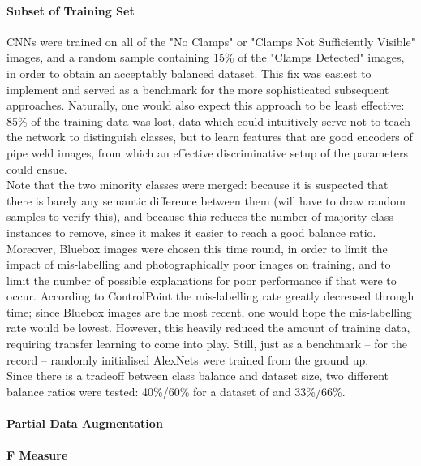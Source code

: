 \documentclass[a4paper,11pt]{article}
\begin{document}
\paragraph{Subset of Training Set}

CNNs were trained on all of the "No Clamps" or "Clamps Not Sufficiently Visible" images, and a random sample containing 15\% of the "Clamps Detected" images, in order to obtain an acceptably balanced dataset. This fix was easiest to implement and served as a benchmark for the more sophisticated subsequent approaches. Naturally, one would also expect this approach to be least effective: 85\% of the training data was lost, data which could intuitively serve not to teach the network to distinguish classes, but to learn features that are good encoders of pipe weld images, from which an effective discriminative setup of the parameters could ensue. \\

Note that the two minority classes were merged: because it is suspected that there is barely any semantic difference between them (will have to draw random samples to verify this), and because this reduces the number of majority class instances to remove, since it makes it easier to reach a good balance ratio. \\

Moreover, Bluebox images were chosen this time round, in order to limit the impact of mis-labelling and photographically poor images on training, and to limit the number of possible explanations for poor performance if that were to occur. According to ControlPoint the mis-labelling rate greatly decreased through time; since Bluebox images are the most recent, one would hope the mis-labelling rate would be lowest. However, this heavily reduced the amount of training data, requiring transfer learning to come into play. Still, just as a benchmark -- for the record -- randomly initialised AlexNets were trained from the ground up. \\

Since there is a tradeoff between class balance and dataset size, two different balance ratios were tested: 40\%/60\% for a dataset of and 33\%/66\%. \\ 

\paragraph{Partial Data Augmentation}

\paragraph{F Measure}
\end{document}
